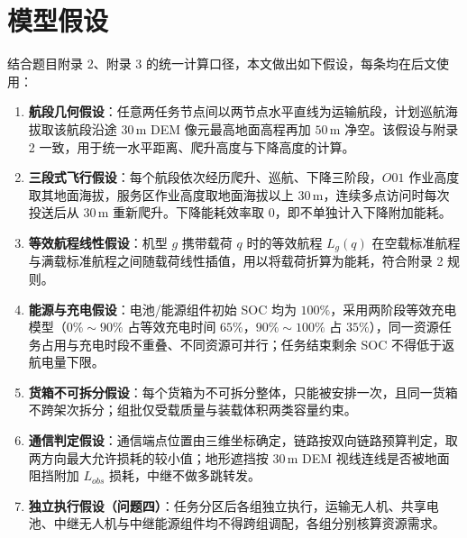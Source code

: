 \section{模型假设}

结合题目附录 2、附录 3 的统一计算口径，本文做出如下假设，每条均在后文使用：

\begin{enumerate}[leftmargin=2em]
  \item \textbf{航段几何假设}：任意两任务节点间以两节点水平直线为运输航段，计划巡航海拔取该航段沿途 $30\,$m DEM 像元最高地面高程再加 $50\,$m 净空。该假设与附录 2 一致，用于统一水平距离、爬升高度与下降高度的计算。
  \item \textbf{三段式飞行假设}：每个航段依次经历爬升、巡航、下降三阶段，$O01$ 作业高度取其地面海拔，服务区作业高度取地面海拔以上 $30\,$m，连续多点访问时每次投送后从 $30\,$m 重新爬升。下降能耗效率取 $0$，即不单独计入下降附加能耗。
  \item \textbf{等效航程线性假设}：机型 $g$ 携带载荷 $q$ 时的等效航程 $L_g(q)$ 在空载标准航程与满载标准航程之间随载荷线性插值，用以将载荷折算为能耗，符合附录 2 规则。
  \item \textbf{能源与充电假设}：电池/能源组件初始 SOC 均为 $100\%$，采用两阶段等效充电模型（$0\%\!\sim\!90\%$ 占等效充电时间 $65\%$，$90\%\!\sim\!100\%$ 占 $35\%$），同一资源任务占用与充电时段不重叠、不同资源可并行；任务结束剩余 SOC 不得低于返航电量下限。
  \item \textbf{货箱不可拆分假设}：每个货箱为不可拆分整体，只能被安排一次，且同一货箱不跨架次拆分；组批仅受载质量与装载体积两类容量约束。
  \item \textbf{通信判定假设}：通信端点位置由三维坐标确定，链路按双向链路预算判定，取两方向最大允许损耗的较小值；地形遮挡按 $30\,$m DEM 视线连线是否被地面阻挡附加 $L_{obs}$ 损耗，中继不做多跳转发。
  \item \textbf{独立执行假设（问题四）}：任务分区后各组独立执行，运输无人机、共享电池、中继无人机与中继能源组件均不得跨组调配，各组分别核算资源需求。
\end{enumerate}
